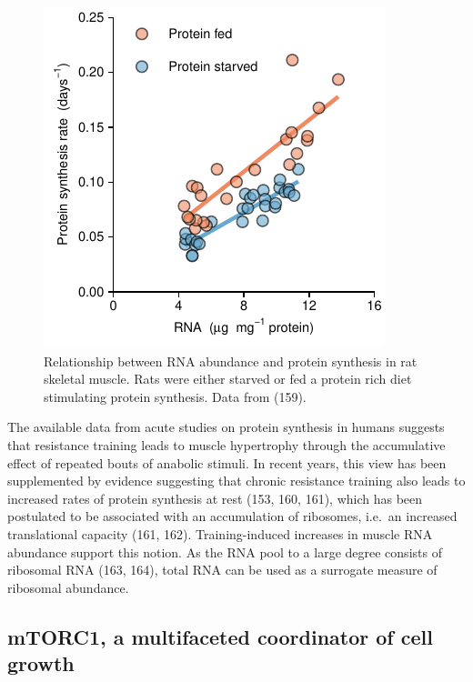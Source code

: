 \documentclass[twoside,10pt]{gihclass} %
\begin{document}
\begin{figure}

{\centering \includegraphics{thesis_files/figure-latex/Millward1973-1} 

}

\caption[Relationship between RNA content and protein synthesis in rat skeletal muscle, data from (159)]{Relationship between RNA abundance and protein synthesis in rat skeletal muscle. Rats were either starved or fed a protein rich diet stimulating protein synthesis. Data from (159).}\label{fig:Millward1973}
\end{figure}
The available data from acute studies on protein synthesis in humans suggests that resistance training leads to muscle hypertrophy through the accumulative effect of repeated bouts of anabolic stimuli. In recent years, this view has been supplemented by evidence suggesting that chronic resistance training also leads to increased rates of protein synthesis at rest
(153, 160, 161),
which has been postulated to be associated with an accumulation of ribosomes, i.e.~an increased translational capacity
(161, 162).
Training-induced increases in muscle RNA abundance support this notion.
As the RNA pool to a large degree consists of ribosomal RNA
(163, 164),
total RNA can be used as a surrogate measure of ribosomal abundance.

\hypertarget{mtorc1-a-multifaceted-coordinator-of-cell-growth}{%
\subsection{mTORC1, a multifaceted coordinator of cell growth}\label{mtorc1-a-multifaceted-coordinator-of-cell-growth}}
\end{document}
